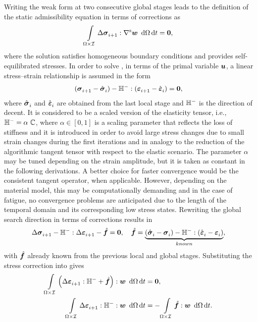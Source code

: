 Writing the weak form at two consecutive global stages leads to the definition of the static admissibility equation in terms of corrections as
\begin{equation}
	\intST \Delta \stepk[]{\fsigma} : \grads{\fw} \contraction\d \Omega \d t = \fzero,
	\label{eq_sa0}
\end{equation}
where the solution satisfies homogeneous boundary conditions and provides self-equilibrated stresses. In order to solve , in terms of the primal variable $\fu$, a linear stress--strain relationship is assumed in the form
\begin{equation}
	(\stepk[ ]{\fsigma}-\stepj[ ]{\fsigma}) - {\ffH^-} \dcontraction (\stepk[]{\feps}-\stepj[]{\feps})= \fzero,
	\label{eq:global_search}
\end{equation}
where $\stepj[ ]{\fsigma}$ and $\stepj[ ]{\feps}$ are obtained from the last local stage and ${\ffH^-}$ is the direction of decent. It is considered to be a scaled version of the elasticity tensor, i.e., $\ffH^-=\alpha \contraction \ffC$, where $\alpha \in [0,1] $ is a scaling parameter that reflects the loss of stiffness and it is introduced in order to avoid large stress changes due to small strain changes during the first iterations and in analogy to the reduction of the algorithmic tangent tensor with respect to the elastic scenario. The parameter $\alpha$ may be tuned depending on the strain amplitude, but it is taken as constant in the following derivations. A better choice for faster convergence would be the consistent tangent operator, when applicable. However, depending on the material model, this may be computationally demanding and in the case of fatigue, no convergence problems are anticipated due to the length of the temporal domain and its corresponding low stress states. Rewriting the global search direction  in terms of corrections results in
\begin{equation}
	\Delta\stepk[]{\fsigma} - \ffH^- \dcontraction \Delta\stepk[]{\feps} - \fhf=\fzero, \quad \fhf = \underbrace{(\stepj{\fsigma}-\stepi{\fsigma}) - \ffH^- \dcontraction  (\stepj[]{\feps}-\stepi[]{\feps})}_{known},
	\label{eq:stress_correction}
\end{equation}
with $\fhf$ already known from the previous local and global stages. Substituting the stress correction into  gives
\begin{equation}
	\begin{split}
		\intST \left( { \Delta\stepk[]{\feps} \dcontraction \ffH^- + \fhf} \right) : {\fw}\contraction\d \Omega \d t & = \fzero,                                               \\
		\intST  \Delta\stepk[]{\feps} \dcontraction \ffH^-   : {\fw}\contraction\d \Omega \d t                      & = - \intST \fhf : {\fw}\contraction\d \Omega \d t .
	\end{split}
	\label{eq_sa01}
\end{equation}

